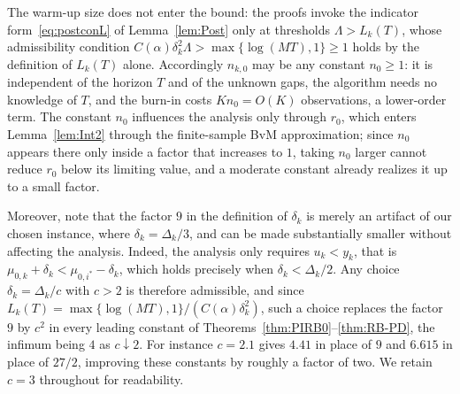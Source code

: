 \documentclass[11pt]{article}
\begin{document}
         The warm-up size does not enter the bound: the proofs invoke the indicator form~\eqref{eq:postconL} of Lemma~\ref{lem:Post} only at thresholds $\Lambda > L_k(T)$, whose admissibility condition $C(\alpha)\delta_k^2\Lambda > \max\{\log(MT),1\} \geq 1$ holds by the definition of $L_k(T)$ alone. Accordingly $n_{k,0}$ may be any constant $n_0 \geq 1$: it is independent of the horizon $T$ and of the unknown gaps, the algorithm needs no knowledge of $T$, and the burn-in costs $Kn_0 = O(K)$ observations, a lower-order term. The constant $n_0$ influences the analysis only through $r_0$, which enters Lemma~\ref{lem:Int2} through the finite-sample BvM approximation; since $n_0$ appears there only inside a factor that increases to $1$, taking $n_0$ larger cannot reduce $r_0$ below its limiting value, and a moderate constant already realizes it up to a small factor. 
         
         Moreover, note that the factor $9$ in the definition of $\delta_k$ is merely an artifact of our chosen instance, where $\delta_k = \Delta_k / 3$, and can be made substantially smaller without affecting the analysis. Indeed, the analysis only requires $u_k < y_k$, that is $\mu_{0,k} + \delta_k < \mu_{0,i^*} - \delta_k$, which holds precisely when $\delta_k < \Delta_k/2$. Any choice $\delta_k = \Delta_k/c$ with $c > 2$ is therefore admissible, and since $L_k(T) = \max\{\log(MT),1\}/(C(\alpha)\delta_k^2)$, such a choice replaces the factor $9$ by $c^2$ in every leading constant of Theorems~\ref{thm:PIRB0}--\ref{thm:RB-PD}, the infimum being $4$ as $c \downarrow 2$. For instance $c = 2.1$ gives $4.41$ in place of $9$ and $6.615$ in place of $27/2$, improving these constants by roughly a factor of two. We retain $c = 3$ throughout for readability.
          
\end{document}
